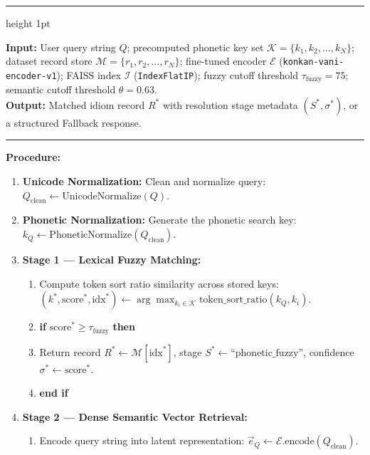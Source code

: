 \documentclass[12pt,a4paper]{article}
\begin{document}
\begin{table}[H]
\centering
\caption{Algorithm 1: Staged Query Resolution and Fallback Routing}
\label{alg:resolution}
\vspace{4pt}
\hrule height 1pt
\vspace{6pt}
\begin{minipage}{0.96\linewidth}
\textbf{Input:} User query string $Q$; precomputed phonetic key set $\mathcal{K} = \{k_1, k_2, \dots, k_N\}$; dataset record store $\mathcal{M} = \{r_1, r_2, \dots, r_N\}$; fine-tuned encoder $\mathcal{E}$ (\texttt{konkan-vani-encoder-v1}); FAISS index $\mathcal{I}$ (\texttt{IndexFlatIP}); fuzzy cutoff threshold $\tau_{\mathrm{fuzzy}} = 75$; semantic cutoff threshold $\theta = 0.63$.\\[3pt]
\textbf{Output:} Matched idiom record $R^*$ with resolution stage metadata $(S^*, \sigma^*)$, or a structured Fallback response.\\[4pt]
\hrule
\vspace{6pt}
\textbf{Procedure:}
\begin{enumerate}
  \itemsep 2pt
  \item \textbf{Unicode Normalization:} Clean and normalize query: $Q_{\mathrm{clean}} \leftarrow \mathrm{UnicodeNormalize}(Q)$.
  \item \textbf{Phonetic Normalization:} Generate the phonetic search key: $k_Q \leftarrow \mathrm{PhoneticNormalize}(Q_{\mathrm{clean}})$.
  \item \textbf{Stage 1 --- Lexical Fuzzy Matching:}
  \begin{enumerate}
    \item Compute token sort ratio similarity across stored keys:\\
    $(k^*, \mathrm{score}^*, \mathrm{idx}^*) \leftarrow \arg\max_{k_i \in \mathcal{K}} \mathrm{token\_sort\_ratio}(k_Q, k_i)$.
    \item \textbf{if} $\mathrm{score}^* \ge \tau_{\mathrm{fuzzy}}$ \textbf{then}
    \item \quad Return record $R^* \leftarrow \mathcal{M}[\mathrm{idx}^*]$, stage $S^* \leftarrow \text{``phonetic\_fuzzy''}$, confidence $\sigma^* \leftarrow \mathrm{score}^*$.
    \item \textbf{end if}
  \end{enumerate}
  \item \textbf{Stage 2 --- Dense Semantic Vector Retrieval:}
  \begin{enumerate}
    \item Encode query string into latent representation: $\vec{e}_Q \leftarrow \mathcal{E}.\mathrm{encode}(Q_{\mathrm{clean}})$.

\end{enumerate}
\end{enumerate}
\end{minipage}
\end{table}
\end{document}
